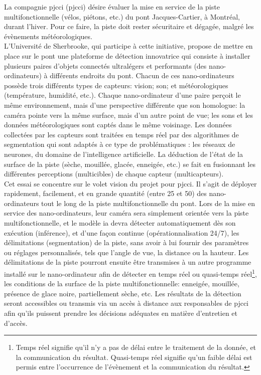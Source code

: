 ﻿\noindent La compagnie \acrlong{pjcci} (\acrshort{pjcci}) désire évaluer la mise en service de la piste multifonctionnelle (vélos, piétons, etc.) du pont Jacques-Cartier, à Montréal, durant l'hiver. Pour ce faire, la piste doit rester sécuritaire et dégagée, malgré les évènements météorologiques.
\vspace{0.5\baselineskip}
\\
\noindent L'Université de Sherbrooke, qui participe à cette initiative, propose de mettre en place sur le pont une plateforme de détection innovatrice qui consiste à installer plusieurs paires d'objets connectés ultralégers et performants (des nano-ordinateurs) à différents endroits du pont. Chacun de ces nano-ordinateurs possède trois différents types de capteurs: vision; son; et météorologiques (température, humidité, etc.). Chaque nano-ordinateur d'une paire perçoit le même environnement, mais d'une perspective différente que son homologue: la caméra pointe vers la même surface, mais d'un autre point de vue; les sons et les données météorologiques sont captés dans le même voisinage. Les données collectées par les capteurs sont traitées en temps réel par des algorithmes de segmentation qui sont adaptés à ce type de problématiques : les réseaux de neurones, du domaine de l'intelligence artificielle. La déduction de l'état de la surface de la piste (sèche, mouillée, glacée, enneigée, etc.) se fait en fusionnant les différentes perceptions (multicibles) de chaque capteur (multicapteurs).
\vspace{0.5\baselineskip}
\\
\noindent Cet essai se concentre sur le volet vision du projet pour \acrshort{pjcci}. Il s'agit de déployer rapidement, facilement, et en grande quantité (entre 25 et 50) des nano-ordinateurs tout le long de la piste multifonctionnelle du pont. Lors de la mise en service des nano-ordinateurs, leur caméra sera simplement orientée vers la piste multifonctionnelle, et le modèle \acrshort{ia} devra détecter automatiquement dès son exécution (inférence), et d'une façon continue (opérationnalisation 24/7), les délimitations (segmentation) de la piste, sans avoir à lui fournir des paramètres ou réglages personnalisés, tels que l'angle de vue, la distance ou la hauteur. Les délimitations de la piste pourront ensuite être transmises à un autre programme installé sur le nano-ordinateur afin de détecter en temps réel ou quasi-temps réel\footnote{Temps réel signifie qu'il n'y a pas de délai entre le traitement de la donnée, et la communication du résultat. Quasi-temps réel signifie qu'un faible délai est permis entre l'occurrence de l'évènement et la communication du résultat.}, les conditions de la surface de la piste multifonctionnelle: enneigée, mouillée, présence de glace noire, partiellement sèche, etc. Les résultats de la détection seront accessibles ou transmis via un accès à distance aux responsables de \acrshort{pjcci} afin qu'ils puissent prendre les décisions adéquates en matière d'entretien et d'accès. 

